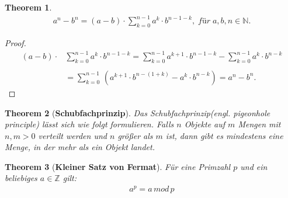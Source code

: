 \documentclass[12pt,oneside]{article}
\newtheorem{theorem}{Theorem}[section]
\theoremstyle{remark}
\theoremstyle{definition}
\begin{document}
\smallskip

\begin{theorem}\label{funny_id}
\begin{align*}
a^{n} - b^n = (a - b) \cdot \sum_{k = 0}^{n - 1} a^{k} \cdot  b^{n - 1 - k}, \; für \; a,b,n \in \mathbb{N}.
\end{align*} 
\end{theorem}

\begin{proof}
\begin{align*}
(a - b) \cdot &\sum_{k = 0}^{n - 1} a^{k} \cdot  b^{n - 1 - k} = \sum_{k = 0}^{n - 1} a^{k + 1}\cdot b^{n - 1 - k} - \sum_{k = 0}^{n - 1} a^k \cdot b^{n - k} \\
\\
&= \sum_{k = 0}^{n - 1} \, (a^{k + 1}\cdot b^{n - (1 + k)} -a^k \cdot b^{n - k}) = a^n - b^n.
\end{align*}
\end{proof}

\smallskip

\begin{theorem}[\textbf{Schubfachprinzip}]\label{pigeonhole} Das Schubfachprinzip(engl. pigeonhole principle) lässt sich wie folgt formulieren.
Falls $n$ Objekte auf $m$ Mengen mit $n,m > 0$ verteilt werden und $n$ größer als $m$ ist, dann gibt es mindestens eine Menge, in der mehr als ein Objekt landet. 

\end{theorem}

\smallskip

\begin{theorem}[\textbf{Kleiner Satz von Fermat}]\label{Th_2}
Für eine Primzahl $p$ und ein beliebiges $a \in \mathbb{Z}$ gilt:
\begin{align*}
    a^p = a \, mod \, p
\end{align*}
\end{theorem}
\end{document}
